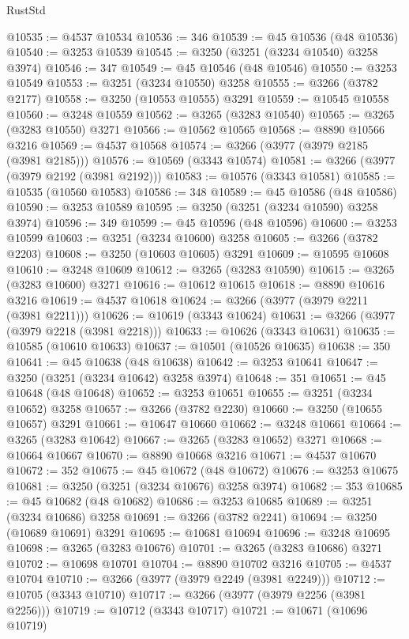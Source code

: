 \begin{lexlean}{RustStd}
\begin{coremodule}
@10535 := @4537 @10534
@10536 := 346
@10539 := @45 @10536 (@48 @10536)
@10540 := @3253 @10539
@10545 := @3250 (@3251 (@3234 @10540) @3258 @3974)
@10546 := 347
@10549 := @45 @10546 (@48 @10546)
@10550 := @3253 @10549
@10553 := @3251 (@3234 @10550) @3258
@10555 := @3266 (@3782 @2177)
@10558 := @3250 (@10553 @10555) @3291
@10559 := @10545 @10558
@10560 := @3248 @10559
@10562 := @3265 (@3283 @10540)
@10565 := @3265 (@3283 @10550) @3271
@10566 := @10562 @10565
@10568 := @8890 @10566 @3216
@10569 := @4537 @10568
@10574 := @3266 (@3977 (@3979 @2185 (@3981 @2185)))
@10576 := @10569 (@3343 @10574)
@10581 := @3266 (@3977 (@3979 @2192 (@3981 @2192)))
@10583 := @10576 (@3343 @10581)
@10585 := @10535 (@10560 @10583)
@10586 := 348
@10589 := @45 @10586 (@48 @10586)
@10590 := @3253 @10589
@10595 := @3250 (@3251 (@3234 @10590) @3258 @3974)
@10596 := 349
@10599 := @45 @10596 (@48 @10596)
@10600 := @3253 @10599
@10603 := @3251 (@3234 @10600) @3258
@10605 := @3266 (@3782 @2203)
@10608 := @3250 (@10603 @10605) @3291
@10609 := @10595 @10608
@10610 := @3248 @10609
@10612 := @3265 (@3283 @10590)
@10615 := @3265 (@3283 @10600) @3271
@10616 := @10612 @10615
@10618 := @8890 @10616 @3216
@10619 := @4537 @10618
@10624 := @3266 (@3977 (@3979 @2211 (@3981 @2211)))
@10626 := @10619 (@3343 @10624)
@10631 := @3266 (@3977 (@3979 @2218 (@3981 @2218)))
@10633 := @10626 (@3343 @10631)
@10635 := @10585 (@10610 @10633)
@10637 := @10501 (@10526 @10635)
@10638 := 350
@10641 := @45 @10638 (@48 @10638)
@10642 := @3253 @10641
@10647 := @3250 (@3251 (@3234 @10642) @3258 @3974)
@10648 := 351
@10651 := @45 @10648 (@48 @10648)
@10652 := @3253 @10651
@10655 := @3251 (@3234 @10652) @3258
@10657 := @3266 (@3782 @2230)
@10660 := @3250 (@10655 @10657) @3291
@10661 := @10647 @10660
@10662 := @3248 @10661
@10664 := @3265 (@3283 @10642)
@10667 := @3265 (@3283 @10652) @3271
@10668 := @10664 @10667
@10670 := @8890 @10668 @3216
@10671 := @4537 @10670
@10672 := 352
@10675 := @45 @10672 (@48 @10672)
@10676 := @3253 @10675
@10681 := @3250 (@3251 (@3234 @10676) @3258 @3974)
@10682 := 353
@10685 := @45 @10682 (@48 @10682)
@10686 := @3253 @10685
@10689 := @3251 (@3234 @10686) @3258
@10691 := @3266 (@3782 @2241)
@10694 := @3250 (@10689 @10691) @3291
@10695 := @10681 @10694
@10696 := @3248 @10695
@10698 := @3265 (@3283 @10676)
@10701 := @3265 (@3283 @10686) @3271
@10702 := @10698 @10701
@10704 := @8890 @10702 @3216
@10705 := @4537 @10704
@10710 := @3266 (@3977 (@3979 @2249 (@3981 @2249)))
@10712 := @10705 (@3343 @10710)
@10717 := @3266 (@3977 (@3979 @2256 (@3981 @2256)))
@10719 := @10712 (@3343 @10717)
@10721 := @10671 (@10696 @10719)

\end{coremodule}
\end{lexlean}
